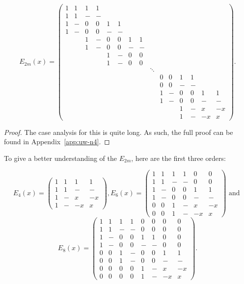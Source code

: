 \begin{lemma}
$$E_{2m}(x) = \left(\begin{array}{rrrrrrrrrrrrrrr} 
1&1&1&1\\1&1&-&-\\1&-&0&0&1&1\\1&-&0&0&-&-\\~&~&1&-&0&0&1&1\\~&~&1&-&0&0&-&-\\~&~&~&~&1&-&0&0\\~&~&~&~&1&-&0&0 \\ ~&~&~&~&~&~&~&~&\ddots \\~&~&~&~&~&~&~&~&~&0&0&1&1 \\ ~&~&~&~&~&~&~&~&~&0&0&-&- \\ ~&~&~&~&~&~&~&~&~&1&-&0&0&1&1 \\ ~&~&~&~&~&~&~&~&~&1&-&0&0&-&- \\~&~&~&~&~&~&~&~&~&~&~&1&-&x&-x \\ ~&~&~&~&~&~&~&~&~&~&~&1&-&-x&x \end{array}\right).$$
\begin{proof}
 The case analysis for this is quite long. As such, the full proof can be found in Appendix~\ref{app:uw-n4}.
\end{proof}

\end{lemma}

\begin{example} \label{ex:e-2m}
To give a better understanding of the $E_{2m}$, here are the first three orders:

$$E_4(x)=\left(
\begin{array}{rrrr}
1 & 1 & 1 & 1 \\
1 & 1 & - & - \\
1 & - & x & -x \\
1 & - & -x & x
\end{array}
\right),
E_6(x)=\left(
\begin{array}{rrrrrr}
1 & 1 & 1 & 1 & 0 & 0\\
1 & 1 & - & - & 0 & 0\\
1 & - & 0 & 0 & 1 & 1\\
1 & - & 0 & 0 & - & -\\
0 & 0 & 1 & - & x & -x\\
0 & 0 & 1 & - & -x & x
\end{array}
\right) \text{ and }
$$
$$
E_8(x)=\left(
\begin{array}{rrrrrrrr}
1 & 1 & 1 & 1 & 0 & 0 & 0 & 0\\
1 & 1 & - & - & 0 & 0 & 0 & 0\\
1 & - & 0 & 0 & 1 & 1 & 0 & 0\\
1 & - & 0 & 0 & - & - & 0 & 0\\
0 & 0 & 1 & - & 0 & 0 & 1 & 1\\
0 & 0 & 1 & - & 0 & 0 & - & -\\
0 & 0 & 0 & 0 & 1 & - & x & -x\\
0 & 0 & 0 & 0 & 1 & - & -x & x
\end{array}
\right).
$$
\end{example}


